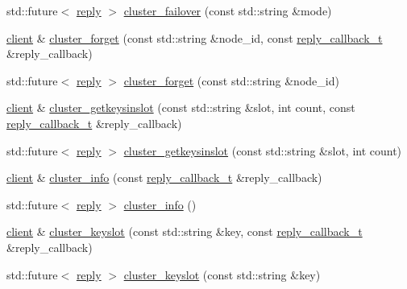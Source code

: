 \begin{DoxyCompactItemize}
\item 
std\+::future$<$ \hyperlink{classcpp__redis_1_1reply}{reply} $>$ \hyperlink{classcpp__redis_1_1client_a06f9c7d27f961787b01a01be95f1fa29}{cluster\+\_\+failover} (const std\+::string \&mode)
\item 
\hyperlink{classcpp__redis_1_1client}{client} \& \hyperlink{classcpp__redis_1_1client_aea8a77acb9031fd03f8ab5dc2c09a17d}{cluster\+\_\+forget} (const std\+::string \&node\+\_\+id, const \hyperlink{classcpp__redis_1_1client_a061a1140d36d2eaeda82b09a0bb3f9f2}{reply\+\_\+callback\+\_\+t} \&reply\+\_\+callback)
\item 
std\+::future$<$ \hyperlink{classcpp__redis_1_1reply}{reply} $>$ \hyperlink{classcpp__redis_1_1client_a58457400352dee764066bd9f737f667a}{cluster\+\_\+forget} (const std\+::string \&node\+\_\+id)
\item 
\hyperlink{classcpp__redis_1_1client}{client} \& \hyperlink{classcpp__redis_1_1client_a716e31987800e3ca5483f72972fecfb0}{cluster\+\_\+getkeysinslot} (const std\+::string \&slot, int count, const \hyperlink{classcpp__redis_1_1client_a061a1140d36d2eaeda82b09a0bb3f9f2}{reply\+\_\+callback\+\_\+t} \&reply\+\_\+callback)
\item 
std\+::future$<$ \hyperlink{classcpp__redis_1_1reply}{reply} $>$ \hyperlink{classcpp__redis_1_1client_ad644ef5c24f3eb51de30a827753cc077}{cluster\+\_\+getkeysinslot} (const std\+::string \&slot, int count)
\item 
\hyperlink{classcpp__redis_1_1client}{client} \& \hyperlink{classcpp__redis_1_1client_a831d52a9dc9115e817bae15db0fb18a6}{cluster\+\_\+info} (const \hyperlink{classcpp__redis_1_1client_a061a1140d36d2eaeda82b09a0bb3f9f2}{reply\+\_\+callback\+\_\+t} \&reply\+\_\+callback)
\item 
std\+::future$<$ \hyperlink{classcpp__redis_1_1reply}{reply} $>$ \hyperlink{classcpp__redis_1_1client_a993170e08c425a810fa757bd4c202d10}{cluster\+\_\+info} ()
\item 
\hyperlink{classcpp__redis_1_1client}{client} \& \hyperlink{classcpp__redis_1_1client_ae0314fc2697674f4be4fca1cc5cbd4a1}{cluster\+\_\+keyslot} (const std\+::string \&key, const \hyperlink{classcpp__redis_1_1client_a061a1140d36d2eaeda82b09a0bb3f9f2}{reply\+\_\+callback\+\_\+t} \&reply\+\_\+callback)
\item 
std\+::future$<$ \hyperlink{classcpp__redis_1_1reply}{reply} $>$ \hyperlink{classcpp__redis_1_1client_a5681ac2dfdacc19cde1a828d8b801df1}{cluster\+\_\+keyslot} (const std\+::string \&key)
\item 

\end{DoxyCompactItemize}
